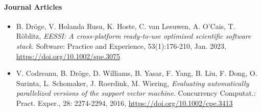 \paragraph{Journal Articles}

\begin{itemize}

\item[] B. Dröge, V. Holanda Rusu, K. Hoste, C. van Leeuwen, A. O'Cais, T. Röblitz, \emph{{EESSI}: {A cross‐platform
    ready‐to‐use optimised scientific software stack}}. Software: Practice and Experience, 53(1):176-210, Jan. 2023,
    \url{https://doi.org/10.1002/spe.3075}

\item[] V. Codreanu, B. Dröge, D. Williams, B. Yasar, F. Yang, B. Liu, F. Dong, O. Surinta, L. Schomaker, J. Roerdink, M. Wiering, \emph{Evaluating automatically parallelized versions of the support vector machine}.
    Concurrency Computat.: Pract. Exper., 28: 2274-2294, 2016,
    \url{https://doi.org/10.1002/cpe.3413}

\end{itemize}
